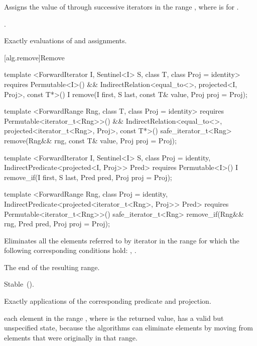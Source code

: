 \begin{itemdescr}
\pnum
\effects
Assigns the value of  through successive iterators in the
range , where  is  for
.

\pnum
\returns
{}.

\pnum
\complexity
Exactly
 evaluations of  and assignments.
\end{itemdescr}

[alg.remove]{Remove}

%
%
\begin{itemdecl}
template <ForwardIterator I, Sentinel<I> S, class T, class Proj = identity>
  requires Permutable<I>() &&
    IndirectRelation<equal_to<>, projected<I, Proj>, const T*>()
  I remove(I first, S last, const T& value, Proj proj = Proj{});

template <ForwardRange Rng, class T, class Proj = identity>
  requires Permutable<iterator_t<Rng>>() &&
    IndirectRelation<equal_to<>, projected<iterator_t<Rng>, Proj>, const T*>()
  safe_iterator_t<Rng>
    remove(Rng&& rng, const T& value, Proj proj = Proj{});

template <ForwardIterator I, Sentinel<I> S, class Proj = identity,
    IndirectPredicate<projected<I, Proj>> Pred>
  requires Permutable<I>()
  I remove_if(I first, S last, Pred pred, Proj proj = Proj{});

template <ForwardRange Rng, class Proj = identity,
    IndirectPredicate<projected<iterator_t<Rng>, Proj>> Pred>
  requires Permutable<iterator_t<Rng>>()
  safe_iterator_t<Rng>
    remove_if(Rng&& rng, Pred pred, Proj proj = Proj{});
\end{itemdecl}

\begin{itemdescr}
\pnum
\effects
Eliminates all the elements referred to by iterator
in the range 
for which the following corresponding conditions hold:
,
.

\pnum
\returns
The end of the resulting range.

\pnum
\remarks Stable~().

\pnum
\complexity
Exactly
applications of the corresponding predicate and projection.

\pnum
\realnote each element in the range , where  is
the returned value, has a valid but unspecified state, because the algorithms
can eliminate elements by moving from elements that were originally
in that range.
\end{itemdescr}

